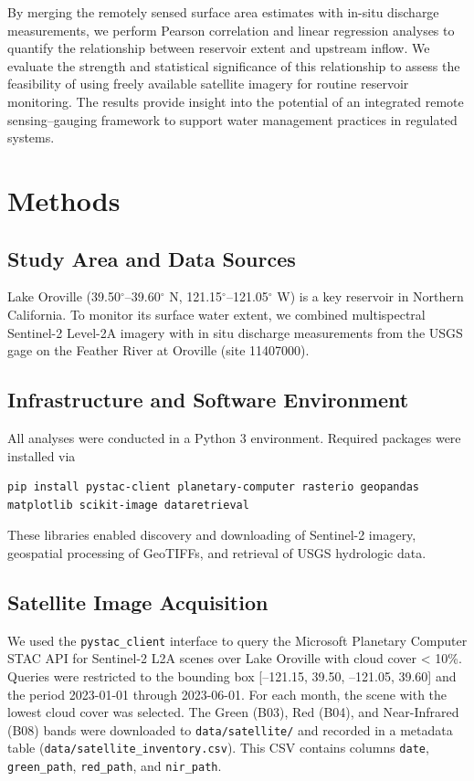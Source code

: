 \documentclass[preprint,12pt]{elsarticle}
\begin{document}
By merging the remotely sensed surface area estimates with in-situ discharge measurements, we perform Pearson correlation and linear regression analyses to quantify the relationship between reservoir extent and upstream inflow. We evaluate the strength and statistical significance of this relationship to assess the feasibility of using freely available satellite imagery for routine reservoir monitoring. The results provide insight into the potential of an integrated remote sensing–gauging framework to support water management practices in regulated systems.

\section{Methods}

\subsection{Study Area and Data Sources}
Lake Oroville (39.50$^\circ$--39.60$^\circ$ N, 121.15$^\circ$--121.05$^\circ$ W) is a key reservoir in Northern California. To monitor its surface water extent, we combined multispectral Sentinel-2 Level-2A imagery with in situ discharge measurements from the USGS gage on the Feather River at Oroville (site 11407000).

\subsection{Infrastructure and Software Environment}
All analyses were conducted in a Python 3 environment. Required packages were installed via
\begin{verbatim}
pip install pystac-client planetary-computer rasterio geopandas matplotlib scikit-image dataretrieval
\end{verbatim}
These libraries enabled discovery and downloading of Sentinel-2 imagery, geospatial processing of GeoTIFFs, and retrieval of USGS hydrologic data.

\subsection{Satellite Image Acquisition}
We used the \texttt{pystac\_client} interface to query the Microsoft Planetary Computer STAC API for Sentinel-2 L2A scenes over Lake Oroville with cloud cover < 10\%. Queries were restricted to the bounding box [--121.15, 39.50, --121.05, 39.60] and the period 2023-01-01 through 2023-06-01. For each month, the scene with the lowest cloud cover was selected. The Green (B03), Red (B04), and Near-Infrared (B08) bands were downloaded to \texttt{data/satellite/} and recorded in a metadata table (\texttt{data/satellite\_inventory.csv}). This CSV contains columns \texttt{date}, \texttt{green\_path}, \texttt{red\_path}, and \texttt{nir\_path}.
\end{document}
